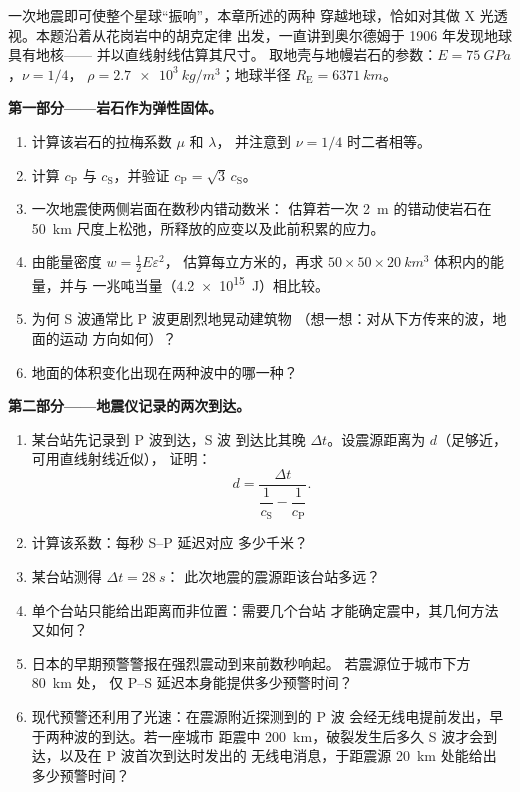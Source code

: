 \begin{problem}\label{pb:b3:continuum-elasticity:1}
一次地震即可使整个星球“振响”，本章所述的两种
穿越地球，恰如对其做 X 光透视。本题沿着从花岗岩中的胡克定律
出发，一直讲到奥尔德姆于 1906 年发现地球具有地核——
并以直线射线估算其尺寸。
取地壳与地幔岩石的参数：$E = \qty{75}{GPa}$，$\nu = 1/4$，
$\rho = \qty{2.7e3}{kg/m^3}$；地球半径 $R_{\text{E}} =
\qty{6371}{km}$。

\medskip\noindent\textbf{第一部分——岩石作为弹性固体。}
\begin{enumerate}
  \item 计算该岩石的拉梅系数 $\mu$ 和 $\lambda$，
        并注意到 $\nu = 1/4$ 时二者相等。
  \item 计算 $c_{\text{P}}$ 与 $c_{\text{S}}$，并验证
        $c_{\text{P}} = \sqrt3\,c_{\text{S}}$。
  \item 一次地震使两侧岩面在数秒内错动数米：
        估算若一次 \qty{2}{m} 的错动使岩石在
        \qty{50}{km} 尺度上松弛，所释放的应变以及此前积累的应力。
  \item 由能量密度 $w = \tfrac12 E\varepsilon^2$，
        估算每立方米的，再求
        $50 \times 50 \times \qty{20}{km^3}$ 体积内的能量，并与
        一兆吨当量（\qty{4.2e15}{J}）相比较。
  \item 为何 S 波通常比 P 波更剧烈地晃动建筑物
        （想一想：对从下方传来的波，地面的运动
        方向如何）？
  \item 地面的体积变化出现在两种波中的哪一种？
\end{enumerate}

\medskip\noindent\textbf{第二部分——地震仪记录的两次到达。}
\begin{enumerate}[resume]
  \item 某台站先记录到 P 波到达，S 波
        到达比其晚 $\Delta t$。设震源距离为 $d$（足够近，可用直线射线近似），
        证明：
        \[
        d = \frac{\Delta t}{\dfrac{1}{c_{\text{S}}} -
        \dfrac{1}{c_{\text{P}}}} .
        \]
  \item 计算该系数：每秒 S--P 延迟对应
        多少千米？
  \item 某台站测得 $\Delta t = \qty{28}{s}$：
        此次地震的震源距该台站多远？
  \item 单个台站只能给出距离而非位置：需要几个台站
        才能确定震中，其几何方法又如何？
  \item 日本的早期预警警报在强烈震动到来前数秒响起。
        若震源位于城市下方 \qty{80}{km} 处，
        仅 P--S 延迟本身能提供多少预警时间？
  \item 现代预警还利用了光速：在震源附近探测到的 P 波
        会经无线电提前发出，早于两种波的到达。若一座城市
        距震中 \qty{200}{km}，破裂发生后多久
        S 波才会到达，以及在 P 波首次到达时发出的
        无线电消息，于距震源 \qty{20}{km} 处能给出
        多少预警时间？
\end{enumerate}


\end{problem}
